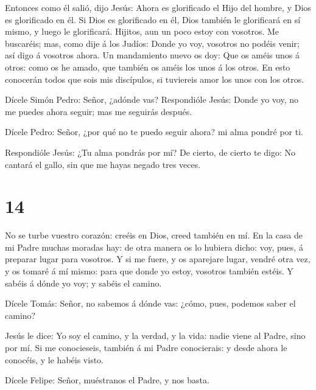  Entonces como él salió, dijo Jesús: Ahora es glorificado
el Hijo del hombre, y Dios es glorificado en él.  Si Dios
es glorificado en él, Dios también le glorificará en sí mismo, y luego
le glorificará.  Hijitos, aun un poco estoy con vosotros.
Me buscaréis; mas, como dije á los Judíos: Donde yo voy, vosotros no
podéis venir; así digo á vosotros ahora.  Un mandamiento
nuevo os doy: Que os améis unos á otros: como os he amado, que también
os améis los unos á los otros.  En esto conocerán todos que
sois mis discípulos, si tuviereis amor los unos con los otros.

 Dícele Simón Pedro: Señor, ¿adónde vas? Respondióle Jesús:
Donde yo voy, no me puedes ahora seguir; mas me seguirás después.

 Dícele Pedro: Señor, ¿por qué no te puedo seguir ahora? mi
alma pondré por ti.

 Respondióle Jesús: ¿Tu alma pondrás por mí? De cierto, de
cierto te digo: No cantará el gallo, sin que me hayas negado tres veces.

\hypertarget{section-13}{%
\section{14}\label{section-13}}

 No se turbe vuestro corazón: creéis en Dios, creed también
en mí.  En la casa de mi Padre muchas moradas hay: de otra
manera os lo hubiera dicho: voy, pues, á preparar lugar para vosotros.
 Y si me fuere, y os aparejare lugar, vendré otra vez, y os
tomaré á mí mismo: para que donde yo estoy, vosotros también estéis.
 Y sabéis á dónde yo voy; y sabéis el camino.

 Dícele Tomás: Señor, no sabemos á dónde vas: ¿cómo, pues,
podemos saber el camino?

 Jesús le dice: Yo soy el camino, y la verdad, y la vida:
nadie viene al Padre, sino por mí.  Si me conocieseis,
también á mi Padre conocierais: y desde ahora le conocéis, y le habéis
visto.

 Dícele Felipe: Señor, muéstranos el Padre, y nos basta.


